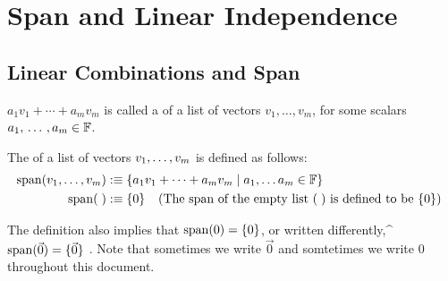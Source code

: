 \section{Span and Linear Independence}
\subsection{Linear Combinations and Span}

\setcounter{thm}{1}
\begin{mydef} 
  $a_1 v_1 + \cdots + a_m v_m$ is called a  of a list of vectors $v_1, \dots, v_m$, for some scalars $a_1, {\, \ldots \,\,}, a_m \in \mathbb{F}$.
\end{mydef}

\setcounter{thm}{3}
\begin{mydef} 
	The  of a list of vectors $v_1, \dots, v_m$ is defined as follows:
  \begin{equation}
    \begin{aligned}
      \operatorname{span} (v_1, \dots, v_m) &:\equiv \{a_1 v_1 + \cdots + a_m v_m \mid a_1, \dots a_m \in \mathbb{F} \}\\
      \operatorname{span} (\; ) &:\equiv \{ 0 \} \;\;\, \text{ (The span of the empty list $(\;)$ is defined to be $\{0\}$)}\;\;
    \end{aligned}
  \end{equation}

  The definition also implies that $\operatorname{span} ( 0) = \{0\}$, or written differently,^ $\operatorname{span} (\vec 0) = \{\vec 0\}$ . Note that sometimes we write $\vec 0$ and somtetimes we write $0$ throughout this document.
\end{mydef}

